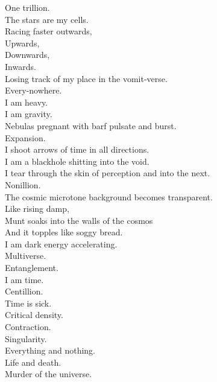 One trillion. \\
The stars are my cells. \\
Racing faster outwards, \\
Upwards, \\
Downwards, \\
Inwards. \\
Losing track of my place in the vomit-verse. \\
Every-nowhere. \\

I am heavy. \\
I am gravity. \\
Nebulas pregnant with barf pulsate and burst. \\
Expansion. \\
I shoot arrows of time in all directions. \\
I am a blackhole shitting into the void. \\
I tear through the skin of perception and into the next. \\

Nonillion. \\
The cosmic microtone background becomes transparent. \\
Like rising damp, \\
Munt soaks into the walls of the cosmos \\
And it topples like soggy bread. \\
I am dark energy accelerating. \\
Multiverse. \\

Entanglement. \\
I am time. \\
Centillion. \\
Time is sick. \\
Critical density. \\
Contraction. \\
Singularity. \\
Everything and nothing. \\
Life and death. \\
Murder of the universe. \\
